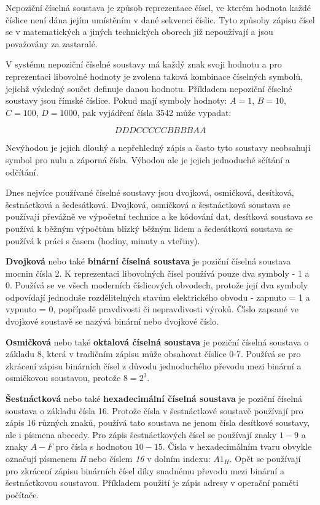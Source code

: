 
Nepoziční číselná soustava je způsob reprezentace čísel, ve kterém hodnota každé číslice není dána jejím umístěním v dané sekvenci číslic. Tyto způsoby zápisu čísel se v matematických a jiných technických oborech již nepoužívají a jsou považovány za zastaralé.

V systému nepoziční číselné soustavy má každý znak svoji hodnotu a pro reprezentaci libovolné hodnoty je zvolena taková kombinace číselných symbolů, jejichž výsledný součet definuje danou hodnotu. Příkladem nepoziční číselné soustavy jsou římské číslice. Pokud mají symboly hodnoty: $A=1$, $B=10$, $C=100$, $D=1000$, pak vyjádření čísla 3542 může vypadat:

$$ DDDCCCCCBBBBAA $$

Nevýhodou je jejich dlouhý a nepřehledný zápis a často tyto soustavy neobsahují symbol pro nulu a záporná čísla. Výhodou ale je jejich jednoduché sčítání a odčítání.


Dnes nejvíce používané číselné soustavy jsou dvojková, osmičková, desítková, šestnáctková a šedesátková. Dvojková, osmičková a šestnáctková soustava se používají převážně ve výpočetní technice a ke kódování dat, desítková soustava se používá k běžným výpočtům blízký běžným lidem a šedesátková soustava se používá k práci s časem (hodiny, minuty a vteřiny).


{\bf Dvojková} nebo také {\bf binární číselná soustava} je poziční číselná soustava mocnin čísla 2. K reprezentaci libovolných čísel používá pouze dva symboly - 1 a 0. Používá se ve všech moderních číslicových obvodech, protože její dva symboly odpovídají jednoduše rozdělitelných stavům elektrického obvodu - zapnuto = 1 a vypnuto = 0, popřípadě pravdivosti či nepravdivosti výroků. Číslo zapsané ve dvojkové soustavě se nazývá binární nebo dvojkové číslo.


{\bf Osmičková} nebo také {\bf oktalová číselná soustava} je poziční číselná soustava o základu 8, která v tradičním zápisu může obsahovat číslice 0-7. Používá se pro zkrácení zápisu binárních čísel z důvodu jednoduchého převodu mezi binární a osmičkovou soustavou, protože $8 = 2^3$.


{\bf Šestnáctková} nebo také {\bf hexadecimální číselná soustava} je poziční číselná soustava o základu čísla 16. Protože čísla v šestnáctkové soustavě používají pro zápis 16 různých znaků, používá tato soustava ne jenom čísla desítkové soustavy, ale i písmena abecedy. Pro zápis šestnáctkových čísel se používají znaky $1-9$ a znaky $A-F$ pro čísla s hodnotou $10-15$.
Čísla v hexadecimálním tvaru obvykle označují písmenem {\it H} nebo číslem {\it 16} v dolním indexu: $A1_H$.
Opět se používají pro zkrácení zápisu binárních čísel díky snadnému převodu mezi binární a šestnáctkovou soustavou. Příkladem použití je zápis adresy v operační paměti počítače.


